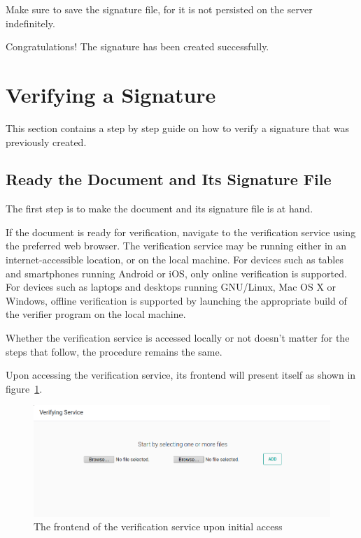 Make sure to save the signature file,
for it is not persisted on the server indefinitely.

Congratulations!
The signature has been created successfully.





\section{Verifying a Signature}\label{sec:verifying-a-signature}
This section contains a step by step guide on how to verify a signature that was previously created.

\subsection{Ready the Document and Its Signature File}\label{subsec:ready-the-document-and-its-signature-file}
The first step is to make the document and its signature file is at hand.

If the document is ready for verification, navigate to the verification service using the preferred web browser.
The verification service may be running either in an internet-accessible location,
or on the local machine.
For devices such as tables and smartphones running Android or iOS,
only online verification is supported.
For devices such as laptops and desktops running GNU/Linux, Mac OS X or Windows,
offline verification is supported by launching the appropriate build of the verifier program on the local machine.

Whether the verification service is accessed locally or not doesn't matter for the steps that follow,
the procedure remains the same.

Upon accessing the verification service, its frontend will present itself as shown in figure~\ref{fig:verify0}.
\begin{figure}[H]
    \begin{center}
        \includegraphics[width=\linewidth]{images/userguide_verify_0.png}
    \end{center}
    \caption{The frontend of the verification service upon initial access}
    \label{fig:verify0}
\end{figure}

